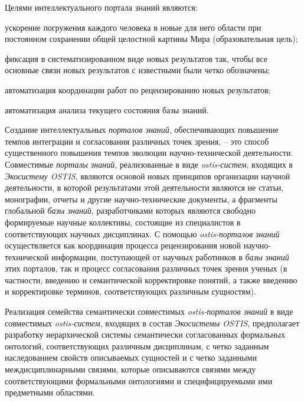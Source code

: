 Целями интеллектуального портала знаний являются:
\begin{textitemize}
    \item ускорение погружения каждого человека в новые для него области при постоянном сохранении общей целостной картины Мира (образовательная цель);
    \item фиксация в систематизированном виде новых результатов так, чтобы все основные связи новых результатов с известными были четко обозначены;
    \item автоматизация координации работ по рецензированию новых результатов;
    \item автоматизация анализа текущего состояния базы знаний.
\end{textitemize}

Создание интеллектуальных \textit{порталов знаний}, обеспечивающих повышение темпов интеграции и согласования различных точек зрения, – это способ существенного повышения темпов эволюции научно-технической деятельности.
Совместимые \textit{порталы знаний}, реализованные в виде \textit{ostis-систем}, входящих в \textit{Экосистему OSTIS}, являются основой новых принципов организации научной деятельности, в которой результатами этой деятельности являются не статьи, монографии, отчеты и другие научно-технические документы, а фрагменты глобальной \textit{базы знаний}, разработчиками которых являются свободно формируемые научные коллективы, состоящие из специалистов в соответствующих научных дисциплинах. 
С помощью \textit{ostis-порталов знаний} осуществляется как координация процесса рецензирования новой научно-технической информации, поступающей от научных работников в \textit{базы знаний} этих порталов, так и процесс согласования различных точек зрения ученых (в частности, введению и семантической корректировке понятий, а также введению и корректировке терминов, соответствующих различным сущностям).

Реализация семейства семантически совместимых \textit{ostis-порталов знаний} в виде совместимых \textit{ostis-систем}, входящих в состав \textit{Экосистемы OSTIS}, предполагает разработку иерархической системы семантически согласованных формальных онтологий, соответствующих различным дисциплинам, с четко заданным наследованием свойств описываемых сущностей и с четко заданными междисциплинарными связями, которые описываются связями между соответствующими формальными онтологиями и специфицируемыми ими предметными областями.

